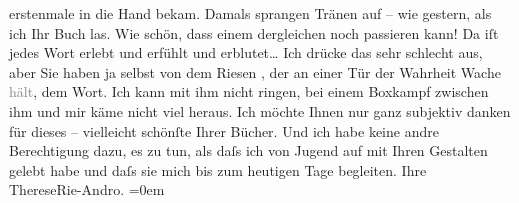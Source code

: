 \begin{ledgroupsized}[t]{13cm}
                    erstenmale in die Hand bekam. Damals sprangen Tränen auf – wie gestern, als ich
                    Ihr Buch las. Wie schön,
                    dass einem dergleichen noch passieren kann! Da iſt jedes Wort erlebt und erfühlt
                    und erblutet{\dots} Ich drücke das sehr schlecht aus, aber
                    Sie haben ja selbst von dem Riesen \label{K_L02568-1v}\label{K_L02568-1h}, der an einer Tür der Wahrheit Wache
                        \textcolor{gray}{hält}, dem Wort. Ich kann mit ihm nicht ringen, bei einem
                    Boxkampf zwischen ihm und mir käme nicht viel heraus. Ich möchte Ihnen nur ganz
                    subjektiv danken für dieses – vielleicht schönſte Ihrer Bücher. Und ich habe
                    keine andre Berechtigung dazu, es zu tun, als daſs ich von Jugend auf mit Ihren
                    Gestalten gelebt habe und daſs sie mich bis zum heutigen Tage begleiten.\pend
           \pstart
           Ihre{\\[\baselineskip]}\spacefill\mbox{ThereseRie-Andro.}\pend
           \leftskip=0em{}
         
         \endnumbering{}\end{ledgroupsized}  \newcommand{\dateiname}{L02568}\newcommand{\titel}{Therese Rie-Andro an Arthur Schnitzler, 25. 12. 1927}\newcommand{\editorInnen}{Martin Anton Müller und Gerd-Hermann Susen}
      